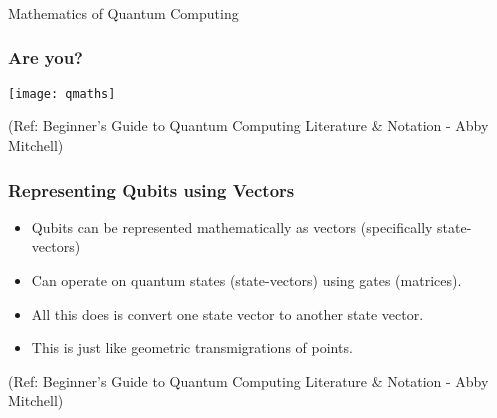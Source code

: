 \begin{frame}[fragile]\frametitle{}
\begin{center}
{\Large Mathematics of Quantum Computing}
\end{center}

\end{frame}

\def\ket#1{|{#1}\rangle}
\def\bra#1{\langle{#1}|}
\def\braket#1#2{\langle{#1}|{#2}\rangle}

\def\hilbert{\mathit{H}}
\def\complex{\mathbb{C}}
\def\tensor{\otimes}
\def\lnanda{\land\negthickspace\negthickspace\negthinspace\sim}
\def\lnandb{\land\negthickspace\negthickspace\negmedspace\negthinspace\sim}
\def\lnandc{\land\negthickspace\negthickspace\negmedspace\negthinspace\negthinspace\sim}
\def\lnandd{\land\negthickspace\negthickspace\negmedspace\negthinspace\negthinspace\negthinspace\sim}

\def\col#1#2{\left(\begin{array}{c}#1\\#2\end{array}\right)}
\def\tcol#1#2{(#1, #2)^T}


 \begin{frame}[fragile]\frametitle{Are you?}

\begin{center}
\texttt{[image: qmaths]}
\end{center}

\tiny{(Ref: Beginner’s Guide to Quantum Computing Literature \& Notation - Abby Mitchell)}

\end{frame}


 \begin{frame}[fragile]\frametitle{Representing Qubits using Vectors}
\begin{itemize}
\item Qubits can be represented mathematically as vectors
(specifically state-vectors)
\item Can operate on quantum states (state-vectors) using gates (matrices).
\item All this does is convert one state vector to
another state vector.
\item This is just like geometric transmigrations of points.
\end{itemize}


\tiny{(Ref: Beginner’s Guide to Quantum Computing Literature \& Notation - Abby Mitchell)}

\end{frame}

